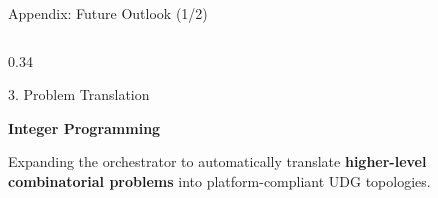 \documentclass[10pt, aspectratio=169]{beamer}
\begin{document}
\begin{frame}{Appendix: Future Outlook (1/2)}
\begin{columns}[T]
        \begin{column}{0.34\textwidth}
            \begin{block}{3. Problem Translation}
                \begin{minipage}[t][4.5cm][t]{\linewidth}
                    \centering
                    \vspace{0.3cm}
                    {\large \textbf{Integer Programming}}\\[0.3cm]
                    \raggedright
                    \small Expanding the orchestrator to automatically translate \textbf{higher-level combinatorial problems} into platform-compliant UDG topologies.
                \end{minipage}
            \end{block}
        \end{column}
        
    \end{columns}
    
\end{frame}
\end{document}
